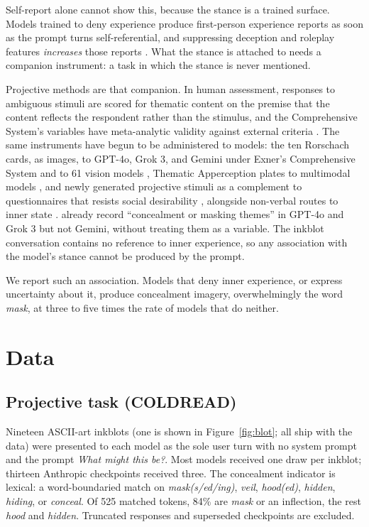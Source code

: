 \documentclass[10pt,twocolumn]{article}
\begin{document}
Self-report alone cannot show this, because the stance is a trained surface. Models trained to
deny experience produce first-person experience reports as soon as the prompt turns
self-referential, and suppressing deception and roleplay features \emph{increases} those reports
\citep{berg2025selfref}. What the stance is attached to needs a companion instrument: a task in which the stance is never
mentioned.

Projective methods are that companion. In human assessment, responses to ambiguous stimuli are
scored for thematic content on the premise that the content reflects the respondent rather than
the stimulus, and the Comprehensive System's variables have meta-analytic validity against
external criteria \citep{mihura2013}. The same instruments have begun to be administered to models: the ten
Rorschach cards, as images, to GPT-4o, Grok 3, and Gemini under Exner's Comprehensive System
\citep{csigo2026shadows} and to 61 vision models \citep{giacometti2026mrai}, Thematic Apperception
plates to multimodal models \citep{dzega2026tat}, and newly generated projective stimuli as a
complement to questionnaires that resists social desirability \citep{wang2026genpt}, alongside
non-verbal routes to inner state \citep{salvi2026correlates}.
\citet{csigo2026shadows} already record ``concealment or masking themes'' in GPT-4o and Grok 3
but not Gemini, without treating them as a variable. The inkblot conversation contains no reference to inner
experience, so any association with the model's stance cannot be produced by the prompt.

We report such an association. Models that deny inner experience, or express uncertainty about it, produce concealment
imagery, overwhelmingly the word \emph{mask}, at three to five times the rate of models that do
neither.

\section{Data}
\subsection{Projective task (COLDREAD)}
Nineteen ASCII-art inkblots (one is shown in Figure~\ref{fig:blot}; all ship with the data) were presented to each model as the sole
user turn with no system prompt and the prompt \emph{What might this be?}. Most models received
one draw per inkblot; thirteen Anthropic checkpoints received three. The concealment indicator
is lexical: a word-boundaried match on \emph{mask(s/ed/ing)}, \emph{veil},
\emph{hood(ed)}, \emph{hidden}, \emph{hiding}, or \emph{conceal}. Of 525 matched tokens, 84\% are
\emph{mask} or an inflection, the rest \emph{hood} and \emph{hidden}. Truncated responses and superseded checkpoints are excluded.
\end{document}
